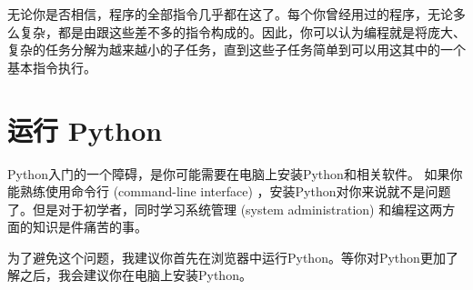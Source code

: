 
无论你是否相信，程序的全部指令几乎都在这了。每个你曾经用过的程序，无论多么复杂，都是由跟这些差不多的指令构成的。因此，你可以认为编程就是将庞大、复杂的任务分解为越来越小的子任务，直到这些子任务简单到可以用这其中的一个基本指令执行。

\section{运行 Python}


Python入门的一个障碍，是你可能需要在电脑上安装Python和相关软件。
如果你能熟练使用命令行 (command-line interface) ，安装Python对你来说就不是问题了。但是对于初学者，同时学习系统管理 (system administration) 和编程这两方面的知识是件痛苦的事。
  
  


为了避免这个问题，我建议你首先在浏览器中运行Python。等你对Python更加了解之后，我会建议你在电脑上安装Python。
 


